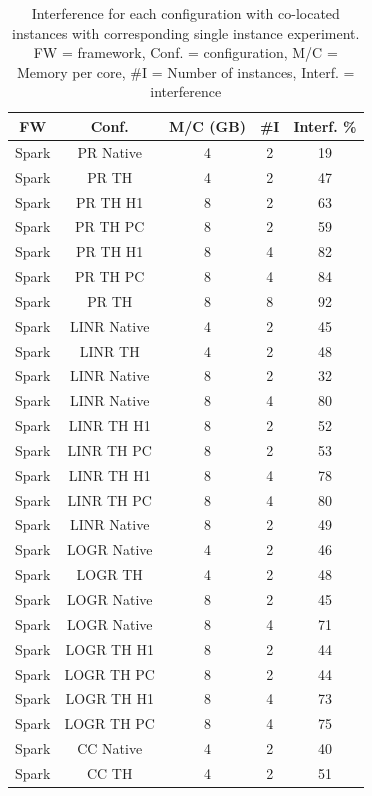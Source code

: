 \begin{table}[thbp]
  \centering
  \caption{Interference for each configuration with co-located instances with corresponding single instance experiment.
	FW = framework, Conf. = configuration, M/C = Memory per core, #I = Number of instances, Interf. = interference }
  \label{tab:interference}
  \begin{tabular}{|c|c|c|c|c|}
    \hline
	  \textbf{FW} & \textbf{Conf.} & \textbf{M/C (GB)} & \textbf{\#I} & \textbf{Interf. \%} \\
    \hline
          Spark & PR Native & 4 & 2 & 19 \\
          Spark & PR TH & 4 & 2 & 47 \\
	  Spark & PR TH H1 & 8 & 2 & 63 \\
	  Spark & PR TH PC & 8 & 2 & 59 \\
	  Spark & PR TH H1 & 8 & 4 &  82 \\
	  Spark & PR TH PC & 8 & 4 & 84 \\
	  Spark & PR TH & 8 & 8 & 92 \\
          Spark & LINR Native & 4 & 2 & 45 \\
          Spark & LINR TH & 4 & 2 & 48 \\
	  Spark & LINR Native & 8 & 2 & 32  \\
	  Spark & LINR Native & 8 & 4 & 80 \\
	  Spark & LINR TH H1 & 8 & 2 & 52 \\
	  Spark & LINR TH PC & 8 & 2 & 53 \\
	  Spark & LINR TH H1 & 8 & 4 & 78 \\
	  Spark & LINR TH PC & 8 & 4 & 80 \\
	  Spark & LINR Native & 8 & 2 & 49 \\
          Spark & LOGR Native & 4 & 2 & 46 \\
          Spark & LOGR TH & 4 & 2 & 48 \\
	  Spark & LOGR Native & 8 & 2 & 45 \\
	  Spark & LOGR Native & 8 & 4 & 71 \\
	  Spark & LOGR TH H1 & 8 & 2 & 44 \\
	  Spark & LOGR TH PC & 8 & 2 & 44 \\
	  Spark & LOGR TH H1 & 8 & 4 & 73 \\
	  Spark & LOGR TH PC & 8 & 4 & 75 \\
          Spark & CC Native & 4 & 2 & 40 \\
          Spark & CC TH & 4 & 2 & 51 \\

\end{tabular}
\end{table}
